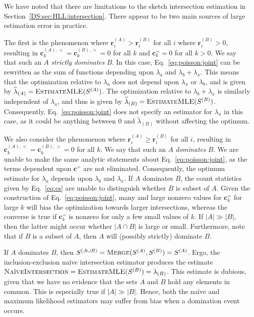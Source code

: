 \documentclass{report}
\newcommand{\algoname}[1]{\textnormal{\textsc{#1}}}
\begin{document}
We have noted that there are limitations to the sketch intersection estimation in Section~\ref{DS:sec:HLL:intersection}.
There appear to be two main sources of large estimation error in practice.

The first is the phenomenon where $\mathbf{r}^{(A)}_i > \mathbf{r}^{(B)}_i$ for all $i$ where $\mathbf{r}^{(B)}_i > 0$, resulting in  $\mathbf{c}^{(A),<}_k = \mathbf{c}^{(B),>}_k = 0$ for all $k$ and $\mathbf{c}^{=}_k = 0$ for all $k > 0$. 
We say that such an $A$ \emph{strictly dominates} $B$. 
In this case, Eq.~\eqref{eq:poisson:joint} can be rewritten as the sum of functions depending upon $\lambda_a$ and $\lambda_b + \lambda_x$. 
This means that the optimization relative to $\lambda_a$ does not depend upon $\lambda_x$ or $\lambda_b$, and is given by $\widetilde{\lambda}_{(A)} = \algoname{EstimateMLE}(S^{(A)})$.
The optimization relative to $\lambda_b + \lambda_x$ is similarly independent of $\lambda_a$, and thus is given by $\widetilde{\lambda}_{(B)} = \algoname{EstimateMLE}(S^{(B)})$.
Consequently, Eq.~\eqref{eq:poisson:joint} does not specify an estimator for $\lambda_x$ in this case, as it could be anything between 0 and $\widetilde{\lambda}_{(B)}$ without affecting the optimum.

We also consider the phenomenon where $\mathbf{r}^{(A)}_i \geq \mathbf{r}^{(B)}_i$ for all $i$, resulting in  $\mathbf{c}^{(A),<}_k = \mathbf{c}^{(B),>}_k = 0$ for all $k$. 
We say that such an $A$ \emph{dominates} $B$. 
We are unable to make the same analytic statements about Eq.~\eqref{eq:poisson:joint}, as the terms dependent upon $\mathbf{c}^{=}$ are not eliminated.
Consequently, the optimum estimate for $\lambda_a$ depends upon $\lambda_b$ and $\lambda_x$. 
If $A$ dominates $B$, the count statistics given by Eq.~\ref{eq:cs} are unable to distinguish whether $B$ is subset of $A$. 
Given the construction of Eq.~\eqref{eq:poisson:joint}, many and large nonzero values for $\mathbf{c}^{=}_k$ for large $k$ will bias the optimization towards larger intersections, whereas the converse is true if $\mathbf{c}^{=}_k$ is nonzero for only a few small values of $k$.
If $|A| \gg |B|$, then the latter might occur whether $|A \cap B|$ is large or small.
Furthermore, note that if $B$ is a subset of $A$, then $A$ will (possibly strictly) dominate $B$. 

If $A$ dominates $B$, then $S^{(A \cup B)} = \algoname{Merge}(S^{(A)}, S^{(B)}) = S^{(A)}$.
Ergo, the inclusion-exclusion na\"ive intersection estimator produces the estimate $\algoname{Na\"iveIntersection} = \algoname{EstimateMLE}(S^{(B)}) = \lambda_{(B)}$.
This estimate is dubious, given that we have no evidence that the sets $A$ and $B$ hold any elements in common. 
This is especially true if $|A| \gg |B|$.
Hence, both the na\"ive and maximum likelihood estimators may suffer from bias when a domination event occurs.
\end{document}
